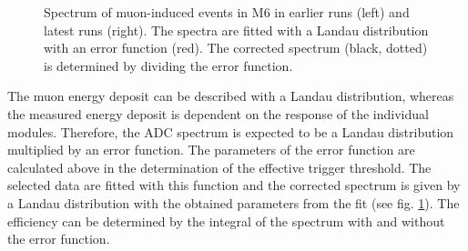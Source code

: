 \begin{figure}[h!]
\begin{subfigure}{0.5\linewidth}
  \end{subfigure}
  \caption{Spectrum of muon-induced events in M6 in earlier runs (left) and latest runs (right). The spectra are fitted with a Landau distribution with an error function (red). The corrected spectrum (black, dotted) is determined by dividing the error function.}
  \label{fig:detection_M6}
\end{figure}

The muon energy deposit can be described with a Landau distribution, whereas the measured energy deposit is dependent on the response of the individual modules. Therefore, the ADC spectrum is expected to be a Landau distribution multiplied by an error function. The parameters of the error function are calculated above in the determination of the effective trigger threshold. The selected data are fitted with this function and the corrected spectrum is given by a Landau distribution with the obtained parameters from the fit (see fig. \ref{fig:detection_M6}). The efficiency can be determined by the integral of the spectrum with and without the error function.


